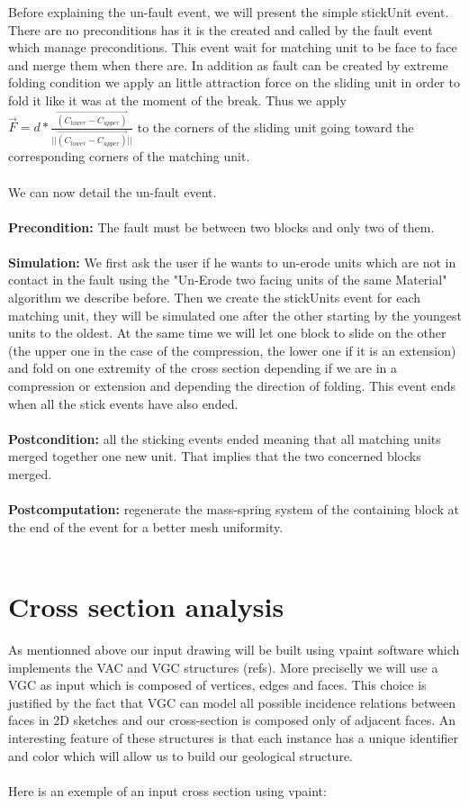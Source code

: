 \documentclass[12pt, a4paper]{report} %
\begin{document}
Before explaining the un-fault event, we will present the simple stickUnit event. There are no preconditions has it is the created and called by the fault event which manage preconditions. This event wait for matching unit to be face to face and merge them when there are. In addition as fault can be created by extreme folding condition we apply an little attraction force on the sliding unit in order to fold it like it was at the moment of the break. Thus we apply $\overrightarrow{F} = d*\frac{\overrightarrow{(C_{lower} - C_{upper})} }{||\overrightarrow{(C_{lower} - C_{upper})}||}$ to the corners of the sliding unit going toward the corresponding corners of the matching unit.\\\\
We can now detail the un-fault event.\\\\
\textbf{Precondition:} The fault must be between two blocks and only two of them.\\\\
\textbf{Simulation:} We first ask the user if he wants to un-erode units which are not in contact in the fault using the "Un-Erode two facing units of the same Material" algorithm we describe before. Then we create the stickUnits event for each matching unit, they will be simulated one after the other starting by the youngest units to the oldest. At the same time we will let one block to slide on the other (the upper one in the case of the compression, the lower one if it is an extension) and fold on one extremity of the cross section depending if we are in a compression or extension and depending the direction of folding. This event ends when all the stick events have also ended.\\\\
\textbf{Postcondition:} all the sticking events ended meaning that all matching units merged together one new unit. That implies that the two concerned blocks merged.\\\\
\textbf{Postcomputation:} regenerate the mass-spring system of the containing block at the end of the event for a better mesh uniformity.\\\\ 
	

\chapter{Cross section analysis}

As mentionned above our input drawing will be built using vpaint software which implements the VAC and VGC structures (refs).
More preciselly we will use a VGC as input which is composed of vertices, edges and faces. This choice is justified by the fact that VGC can model all possible incidence relations between faces in 2D sketches and our cross-section is composed only of adjacent faces. An interesting feature of these structures is that each instance has a unique identifier and color which will allow us to build our geological structure.\\\\
Here is an exemple of an input cross section using vpaint:
\end{document}
